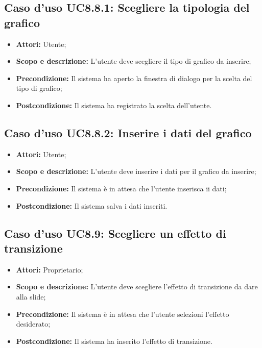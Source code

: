 	\subsection{Caso d'uso UC8.8.1: Scegliere la tipologia del grafico}
	\begin{itemize}
		\item \textbf{Attori:} Utente;
		\item \textbf{Scopo e descrizione:} L'utente deve scegliere il tipo di grafico da inserire;
		\item \textbf{Precondizione:} Il sistema ha aperto la finestra di dialogo per la scelta del tipo di grafico;
		\item \textbf{Postcondizione:} Il sistema ha registrato la scelta dell'utente.
	\end{itemize}
	
	\subsection{Caso d'uso UC8.8.2: Inserire i dati del grafico}
	\begin{itemize}
		\item \textbf{Attori:} Utente;
		\item \textbf{Scopo e descrizione:} L'utente deve inserire i dati per il grafico da inserire;
		\item \textbf{Precondizione:} Il sistema è in attesa che l'utente inserisca ii dati;
		\item \textbf{Postcondizione:} Il sistema salva i dati inseriti.
	\end{itemize}


\subsection{Caso d'uso UC8.9: Scegliere un effetto di transizione}
\begin{itemize}
	\item \textbf{Attori:} Proprietario;
	\item \textbf{Scopo e descrizione:} L'utente deve scegliere l'effetto di transizione da dare alla slide;
	\item \textbf{Precondizione:} Il sistema è in attesa che l'utente selezioni l'effetto desiderato;
	\item \textbf{Postcondizione:} Il sistema ha inserito l'effetto di transizione.
\end{itemize}


